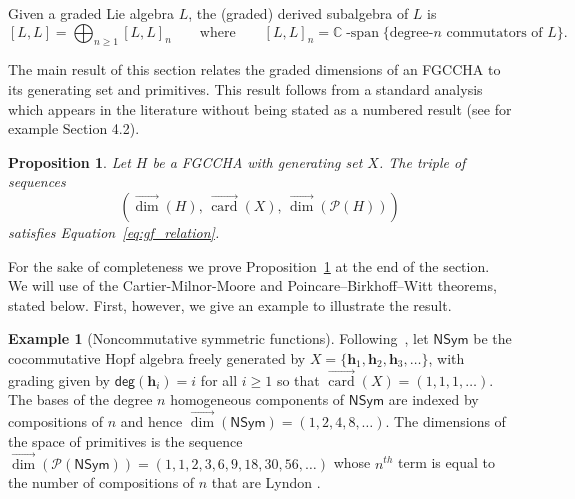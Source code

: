 \documentclass[11pt]{amsart}
\newtheorem{proposition}[theorem]{Proposition}
\theoremstyle{definition}
\newtheorem{example}[theorem]{Example}
\numberwithin{equation}{section}
\def\CC{{\mathbb C}}
\newcommand{\FGCCHA}{\textsf{FGCCHA}\xspace}
\newcommand{\vecdim}{\overrightarrow{\dim}}
\newcommand{\veccard}{\overrightarrow{\operatorname{card}}}
\begin{document}
Given a graded Lie algebra $L$, the (graded) derived subalgebra of $L$ is 
\begin{equation}
\label{eq:derivedLiesubalgebra}
[L, L] = \bigoplus_{n \ge 1} [L, L]_{n}
\qquad\text{where}\qquad
[L, L]_{n} = \CC\operatorname{-span}\{\text{degree-$n$ commutators of $L$}\}.
\end{equation}

The main result of this section relates the graded dimensions of an \FGCCHA to its generating set and primitives.
This result follows from a standard analysis which appears in the literature without being stated
as a numbered result (see for example \cite{AL15} Section 4.2).

\begin{proposition}
\label{prop:SequencesAsHopfStructures}
Let $H$ be a \FGCCHA with generating set $X$.  The triple of sequences
\[
\left(\vecdim(H), \,
\veccard(X),\,
\vecdim\left(\mathcal{P}(H)\right) \right)
\]
satisfies Equation~\eqref{eq:gf_relation}.
\end{proposition}


For the sake of completeness we prove Proposition~\ref{prop:SequencesAsHopfStructures} at the end of the section.  
We will use of the Cartier-Milnor-Moore and Poincare--Birkhoff--Witt theorems, stated below.  
First, however,  we give an example to illustrate the result.  

\begin{example}[Noncommutative symmetric functions]
\label{ex:NSym}
Following~\cite{GKLLRT}, let $\mathsf{NSym}$ \cite{GKLLRT} be the cocommutative Hopf algebra freely generated by $X = \{ \mathbf{h}_1, \mathbf{h}_2, \mathbf{h}_3, \ldots \}$, with grading given by $\mathsf{deg}(\mathbf{h}_{i}) = i$ for all $i \ge 1$ so that $\veccard(X) = (1, 1, 1, \ldots)$.  
The bases of the degree $n$ homogeneous components of $\mathsf{NSym}$ are indexed by compositions
of $n$ and hence $\vecdim(\mathsf{NSym}) = (1,2,4,8,\ldots)$.
The dimensions of the space of primitives is the sequence 
$\vecdim(\mathcal{P}(\mathsf{NSym})) = (1, 1, 2, 3, 6, 9, 18, 30, 56, \ldots)$
whose $n^{th}$ term is equal to the number
of compositions of $n$ that are Lyndon \cite{H07}.
\end{example}

\end{document}
